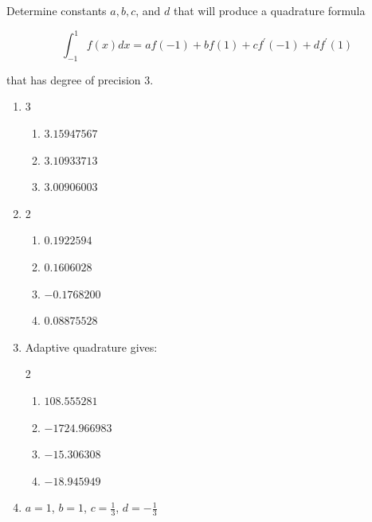 \begin{posttest}[\textcolor{red}{End of Module 5 Quiz}]
\item Determine constants $a, b, c$, and $d$ that will produce a quadrature formula

$$
\int_{-1}^{1} f(x) d x=a f(-1)+b f(1)+c f^{\prime}(-1)+d f^{\prime}(1)
$$

that has degree of precision $3$.
\begin{mysolution}
\begin{enumerate}[label=\arabic*.]
\item
\begin{multicols}{3}
\begin{enumerate}[label=(\alph*)]
\item $3.15947567$
\item $3.10933713$
\item $3.00906003$
\end{enumerate}
\end{multicols}

\item
\begin{multicols}{2}
\begin{enumerate}[label=(\alph*)]
\item $0.1922594$ \item $0.1606028$ \item$-0.1768200$ \item $0.08875528$ 
\end{enumerate}
\end{multicols}

\item Adaptive quadrature gives:
\begin{multicols}{2}
\begin{enumerate}[label=(\alph*)]
\item $108.555281$ \item $-1724.966983$  \item$-15.306308$ \item $-18.945949$
\end{enumerate}
\end{multicols}

\item $a =1$, $b =1$, $c = \frac13$, $d =-\frac13$
\end{enumerate}


\end{mysolution}
\end{posttest}


